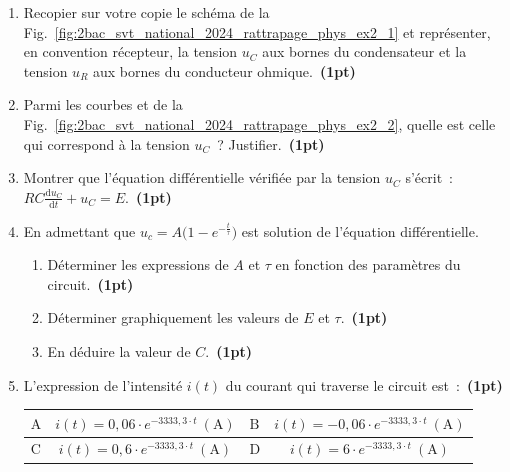 \begin{enumerate}
    \item Recopier sur votre copie le schéma de la
          Fig.~\ref{fig:2bac_svt_national_2024_rattrapage_phys_ex2_1} et
          représenter, en convention récepteur, la tension $u_{C}$ aux bornes du
          condensateur et la tension $u_{R}$ aux bornes du conducteur
          ohmique.~\textbf{(1pt)}
    \item Parmi les courbes  et  de la
          Fig.~\ref{fig:2bac_svt_national_2024_rattrapage_phys_ex2_2}, quelle
          est celle qui correspond à la tension $u_{C}$~?
          Justifier.~\textbf{(1pt)}
    \item Montrer que l'équation différentielle vérifiée par la tension $u_{C}$
          s'écrit~:
          $RC\frac{\mathrm{d}u_{C}}{\mathrm{d}t}+u_{C}=E$.~\textbf{(1pt)}
    \item En admettant que $u_{c}=A\bigl(1-e^{-\frac{t}{\tau}}\bigr)$ est
          solution de l'équation différentielle.
          \begin{enumerate}
              \item Déterminer les expressions de $A$ et $\tau$ en fonction des
                    paramètres du circuit.~\textbf{(1pt)}
              \item Déterminer graphiquement les valeurs de $E$ et
                    $\tau$.~\textbf{(1pt)}
              \item En déduire la valeur de $C$.~\textbf{(1pt)}
          \end{enumerate}
    \item L'expression de l'intensité $i(t)$ du courant qui traverse le circuit
          est~:~\textbf{(1pt)}

          \begin{minipage}{\linewidth}
          \begin{table}[H]
              \centering
              \setlength{\arrayrulewidth}{0.8pt}
              \renewcommand{\arraystretch}{1.3}
              \begin{tabularx}{\textwidth}{|
                  >{\arraybackslash\centering}p{6mm}|C|
                  >{\arraybackslash\centering}p{6mm}|C|}
              \hline
              $\mathrm{A}$ & $i(t)=0,06\cdot e^{-3333,3\cdot t}~(\unit{\A})$
              &
              $\mathrm{B}$ & $i(t)=-0,06\cdot e^{-3333,3\cdot t}~(\unit{\A})$ \\
              \hline
              $\mathrm{C}$ & $i(t)=0,6\cdot e^{-3333,3\cdot t}~(\unit{\A})$
              &
              $\mathrm{D}$ & $i(t)=6\cdot e^{-3333,3\cdot t}~(\unit{\A})$ \\
              \hline
              \end{tabularx}
          \end{table}
          \end{minipage}
\end{enumerate}


